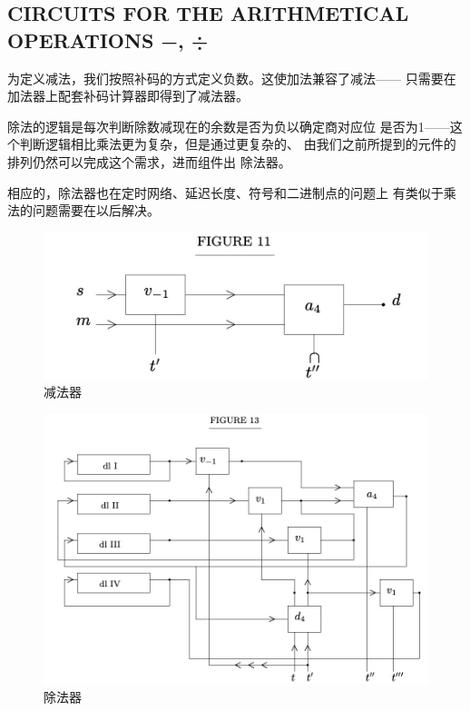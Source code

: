 \documentclass[UTF8]{ctexart}
\begin{document}
\subsection{CIRCUITS FOR THE ARITHMETICAL OPERATIONS −, ÷}

为定义减法，我们按照补码的方式定义负数。这使加法兼容了减法——
只需要在加法器上配套补码计算器即得到了减法器。

除法的逻辑是每次判断除数减现在的余数是否为负以确定商对应位
是否为1——这个判断逻辑相比乘法更为复杂，但是通过更复杂的、
由我们之前所提到的元件的排列仍然可以完成这个需求，进而组件出
除法器。

相应的，除法器也在定时网络、延迟长度、符号和二进制点的问题上
有类似于乘法的问题需要在以后解决。

\begin{figure}[H]
\centering
\includegraphics[width=\textwidth]{./pics/11.jpeg}
\caption{减法器}
\end{figure}

\begin{figure}[H]
\centering
\includegraphics[width=\textwidth]{./pics/12.jpeg}
\caption{除法器}
\end{figure}
\end{document}
